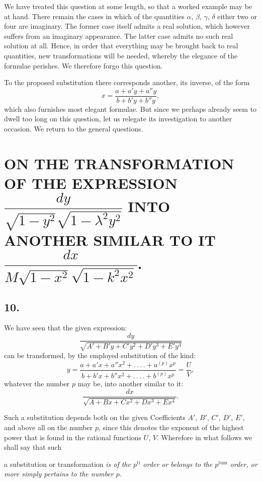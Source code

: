 \documentclass{article}
\begin{document}

We have treated this question at some length, so that a worked example may be at hand. There remain the cases in which of the quantities $\alpha$, $\beta$, $\gamma$, $\delta$ either two or four are imaginary. The former case itself admits a real solution, which however suffers from an imaginary appearance. The latter case admits no such real solution at all. Hence, in order that everything may be brought back to real quantities, new transformations will be needed, whereby the elegance of the formulae perishes. We therefore forgo this question.

To the proposed substitution there corresponds another, its inverse, of the form
\[
x=\frac{a+a'y+a''y}{b+b'y+b''y},
\]
which also furnishes most elegant formulae. But since we perhaps already seem to dwell too long on this question, let us relegate its investigation to another occasion. We return to the general questions.

\section*{ON THE TRANSFORMATION OF THE EXPRESSION $\dfrac{dy}{\sqrt{1-y^{2}}\sqrt{1-\lambda^{2}y^{2}}}$ INTO ANOTHER SIMILAR TO IT $\dfrac{dx}{M\sqrt{1-x^{2}}\sqrt{1-k^{2}x^{2}}}$.}

\subsection*{10.}

We have seen that the given expression:
\[
\frac{dy}{\sqrt{A'+B'y+C'y^{2}+D'y^{3}+E'y^{4}}}
\]
can be transformed, by the employed substitution of the kind:
\[
y=\frac{a+a'x+a''x^{2}+.\,.\,.\,.+a^{(p)}x^{p}}{b+b'x+b''x^{2}+.\,.\,.\,.+b^{(p)}x^{p}}=\frac{U}{V},
\]
whatever the number $p$ may be, into another similar to it:
\[
\frac{dx}{\sqrt{A+Bx+Cx^{2}+Dx^{3}+Ex^{4}}}.
\]

Such a substitution depends both on the given Coefficients $A'$, $B'$, $C'$, $D'$, $E'$, and above all on the number $p$, since this denotes the exponent of the highest power that is found in the rational functions $U$, $V$. Wherefore in what follows we shall say that such

a substitution or transformation \emph{is of the $p^{\mathrm{ti}}$ order or belongs to the $p^{\mathrm{tum}}$ order, or more simply pertains to the number $p$.}
\end{document}
